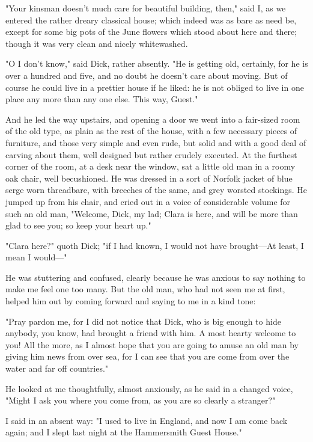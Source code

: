 "Your kinsman doesn't much care for beautiful building, then," said I,
as we entered the rather dreary classical house; which indeed was as
bare as need be, except for some big pots of the June flowers which
stood about here and there; though it was very clean and nicely
whitewashed.

"O I don't know," said Dick, rather absently. "He is getting old,
certainly, for he is over a hundred and five, and no doubt he doesn't
care about moving. But of course he could live in a prettier house if he
liked: he is not obliged to live in one place any more than any one
else. This way, Guest."

And he led the way upstairs, and opening a door we went into a
fair-sized room of the old type, as plain as the rest of the house, with
a few necessary pieces of furniture, and those very simple and even
rude, but solid and with a good deal of carving about them, well
designed but rather crudely executed. At the furthest corner of the
room, at a desk near the window, sat a little old man in a roomy oak
chair, well becushioned. He was dressed in a sort of Norfolk jacket of
blue serge worn threadbare, with breeches of the same, and grey worsted
stockings. He jumped up from his chair, and cried out in a voice of
considerable volume for such an old man, "Welcome, Dick, my lad; Clara
is here, and will be more than glad to see you; so keep your heart up."

"Clara here?" quoth Dick; "if I had known, I would not have brought---At
least, I mean I would---"

He was stuttering and confused, clearly because he was anxious to say
nothing to make me feel one too many. But the old man, who had not seen
me at first, helped him out by coming forward and saying to me in a kind
tone:

"Pray pardon me, for I did not notice that Dick, who is big enough to
hide anybody, you know, had brought a friend with him. A most hearty
welcome to you! All the more, as I almost hope that you are going to
amuse an old man by giving him news from over sea, for I can see that
you are come from over the water and far off countries."

He looked at me thoughtfully, almost anxiously, as he said in a changed
voice, "Might I ask you where you come from, as you are so clearly a
stranger?"

I said in an absent way: "I used to live in England, and now I am come
back again; and I slept last night at the Hammersmith Guest House."

